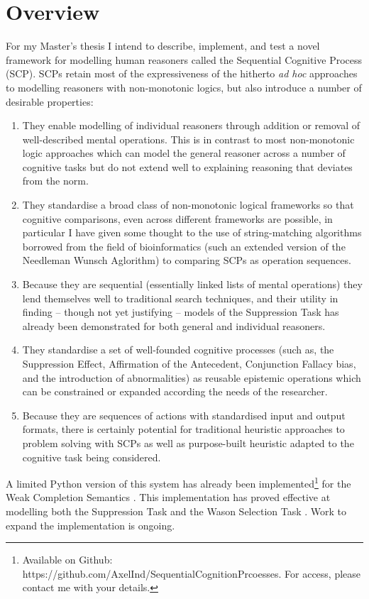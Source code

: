 \documentclass{article}
\begin{document}
\section{Overview}
For my Master's thesis I intend to describe, implement, and test a novel framework for modelling human reasoners called the Sequential Cognitive Process (SCP). SCPs retain most of the expressiveness of the hitherto \textit{ad hoc} approaches to modelling reasoners with non-monotonic logics, but also introduce a number of desirable properties:
\begin{enumerate}
\item They enable modelling of individual reasoners through addition or removal of well-described mental operations. This is in contrast to most non-monotonic logic approaches which can model the general reasoner across a number of cognitive tasks but do not extend well to explaining reasoning that deviates from the norm.
\item They standardise a broad class of non-monotonic logical frameworks so that cognitive comparisons, even across different frameworks are possible, in particular I have given some thought to the use of string-matching algorithms borrowed from the field of bioinformatics (such an extended version of the Needleman Wunsch Aglorithm\citep{needleman1970general}) to comparing SCPs as operation sequences.
\item Because they are sequential (essentially linked lists of mental operations) they lend themselves well to traditional search techniques, and their utility in finding -- though not yet justifying -- models of the Suppression Task has already been demonstrated for both general and individual reasoners.
\item They standardise a set of well-founded cognitive processes (such as, the Suppression Effect, Affirmation of the Antecedent, Conjunction Fallacy bias, and the introduction of abnormalities) as reusable epistemic operations which can be constrained or expanded according the needs of the researcher.
\item Because they are sequences of actions with standardised input and output formats, there is certainly potential for traditional heuristic approaches to problem solving with SCPs as well as purpose-built heuristic adapted to the cognitive task being considered.
\end{enumerate}

A limited Python version of this system has already been implemented\footnote{Available on Github: https://github.com/AxelInd/SequentialCognitionPrcoesses. For access, please contact me with your details.} for the Weak Completion Semantics \citep{holldobler2015weak}. This implementation has proved effective at modelling both the Suppression Task \citep{byrne1989suppressing} and the Wason Selection Task \citep{wason1968reasoning}. Work to expand the implementation is ongoing.
\end{document}
